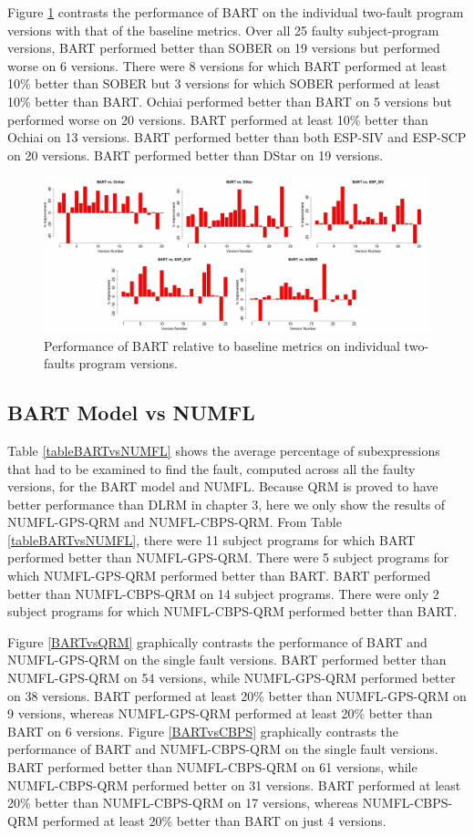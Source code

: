 Figure \ref{BART_VS_Base_M} contrasts the performance of BART on the individual two-fault program versions with that of the baseline metrics.  Over all 25 faulty subject-program versions, BART performed better than SOBER on 19 versions but performed worse on 6 versions.  There were 8 versions for which BART performed at least 10\% better than SOBER but 3 versions for which SOBER performed at least 10\% better than BART.  Ochiai performed better than BART on 5 versions but performed worse on 20 versions. BART performed at least 10\% better than Ochiai on 13 versions. BART performed better than both ESP-SIV and ESP-SCP on 20 versions.   BART performed better than DStar on 19 versions.

\begin{figure}
\centering
\includegraphics[width=\textwidth]{chapter4_BARTvsBase_M.pdf}
\caption{Performance of BART relative to baseline metrics on individual two-faults program versions.}
\label{BART_VS_Base_M}
\end{figure}


\subsection{BART Model vs NUMFL}
Table \ref{tableBARTvsNUMFL} shows the average percentage of subexpressions that had to be examined to find the fault, computed across all the faulty versions, for the BART model and NUMFL.  Because QRM is proved to have better performance than DLRM in chapter 3, here we only show the results of NUMFL-GPS-QRM and NUMFL-CBPS-QRM.  From Table \ref{tableBARTvsNUMFL}, there were 11 subject programs for which BART performed better than NUMFL-GPS-QRM. There were 5 subject programs for which NUMFL-GPS-QRM performed better than BART. BART performed better than NUMFL-CBPS-QRM on 14 subject programs. There were only 2 subject programs for which NUMFL-CBPS-QRM performed better than BART.

Figure \ref{BARTvsQRM} graphically contrasts the performance of BART and NUMFL-GPS-QRM on the single fault versions.  BART performed better than NUMFL-GPS-QRM on 54 versions, while NUMFL-GPS-QRM performed better on 38 versions.  BART performed at least 20\% better than NUMFL-GPS-QRM on 9 versions, whereas NUMFL-GPS-QRM performed at least 20\% better than BART on 6 versions. Figure \ref{BARTvsCBPS} graphically contrasts the performance of BART and NUMFL-CBPS-QRM on the single fault versions.  BART performed better than NUMFL-CBPS-QRM on 61 versions, while NUMFL-CBPS-QRM performed better on 31 versions.  BART performed at least 20\% better than NUMFL-CBPS-QRM on 17 versions, whereas NUMFL-CBPS-QRM performed at least 20\% better than BART on just 4 versions.

